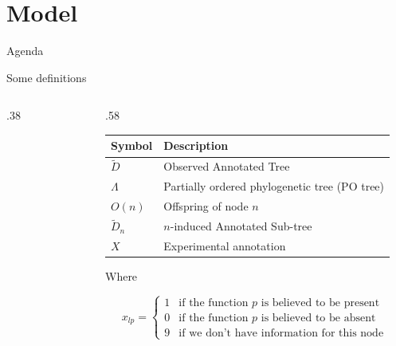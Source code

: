 \documentclass[9pt,handout,ignorenonframetext,]{beamer}
\newcommand{\includetikz}[2]{
\begin{figure}
\scalebox{#2}{

}
\end{figure}
}
\newcommand{\phylo}{\Lambda{}} %
\newcommand{\aphylo}{D{}}      %
\newcommand{\aphyloObs}{\tilde \aphylo{}} %
\newcommand{\AnnObs}{X{}}
\newcommand{\annObs}{x{}}
\def\begincols{\begin{columns}[T]}
\def\begincol{\begin{column}[T]}
\def\endcol{\end{column}}
\def\endcols{\end{columns}}
\begin{document}
\section{Model}\label{model}

\begin{frame}[t]{Agenda}

\tableofcontents[currentsection]

\end{frame}

\begin{frame}[t,label=definitions]{Some definitions}

\begincols

\begincol{.38\linewidth}

\includetikz{simple_tree_names.tex}{.5}

\endcol

\begincol{.58\linewidth}

\footnotesize

\begin{longtable}[]{@{}ll@{}}
\toprule
Symbol & Description\tabularnewline
\midrule
\endhead
\(\aphyloObs\) & Observed Annotated Tree\tabularnewline
\(\phylo\) & Partially ordered phylogenetic tree (PO
tree)\tabularnewline
\(O(n)\) & Offspring of node \(n\)\tabularnewline
\(\aphyloObs_n\) & \(n\)-induced Annotated Sub-tree\tabularnewline
\(\AnnObs\) & Experimental annotation\tabularnewline
\bottomrule
\end{longtable}

Where

\[
\annObs_{lp} = \left\{
\begin{array}{ll}
1 & \mbox{if the function }p\mbox{ is believed to be present}\\
0 & \mbox{if the function }p\mbox{ is believed to be absent}\\
9 & \mbox{if we don't have information for this node }
\end{array}\right.
\]

\normalsize

\hyperlink{formaldef}{}

\endcol

\endcols

\end{frame}
\end{document}
